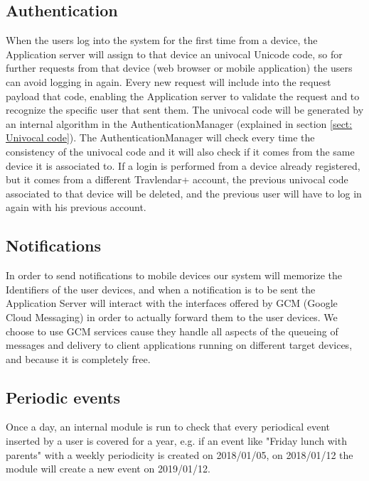 \subsection{Authentication}
When the users log into the system for the first time from a device, the Application server will assign to that device an univocal Unicode code, so for further requests from that device (web browser or mobile application) the users can avoid logging in again. Every new request will include into the request payload that code, enabling the Application server to validate the request and to recognize the specific user that sent them. The univocal code will be generated by an internal algorithm in the AuthenticationManager (explained in section \ref{sect: Univocal code}). The AuthenticationManager will check every time the consistency of the univocal code and it will also check if it comes from the same device it is associated to.
If a login is performed from a device already registered, but it comes from a different Travlendar+ account, the previous univocal code associated to that device will be deleted, and the previous user will have to log in again with his previous account.

\subsection{Notifications}
In order to send notifications to mobile devices our system will memorize the Identifiers of the user devices, and when a notification is to be sent the Application Server will interact with the interfaces offered by GCM (Google Cloud Messaging) in order to actually forward them to the user devices. We choose to use GCM services cause they handle all aspects of the queueing of messages and delivery to client applications running on different target devices, and because it is completely free.

\subsection{Periodic events}
Once a day, an internal module is run to check that every periodical event inserted by a user is covered for a year, e.g. if an event like "Friday lunch with parents" with a weekly periodicity is created on 2018/01/05, on 2018/01/12 the module will create a new event on 2019/01/12.